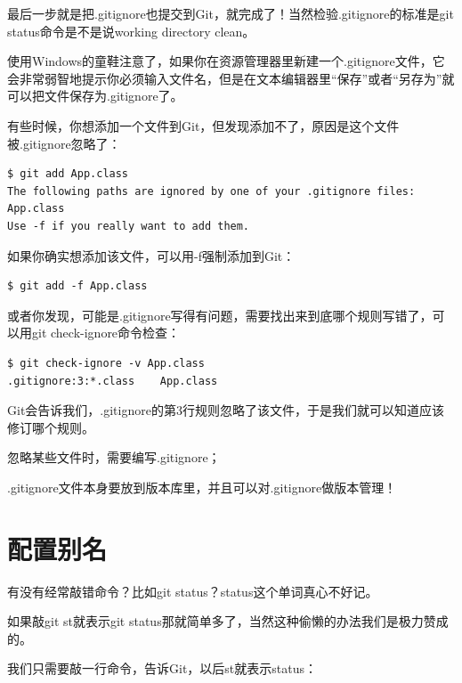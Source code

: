 最后一步就是把.gitignore也提交到Git，就完成了！当然检验.gitignore的标准是git status命令是不是说working directory clean。

使用Windows的童鞋注意了，如果你在资源管理器里新建一个.gitignore文件，它会非常弱智地提示你必须输入文件名，但是在文本编辑器里“保存”或者“另存为”就可以把文件保存为.gitignore了。

有些时候，你想添加一个文件到Git，但发现添加不了，原因是这个文件被.gitignore忽略了：

\begin{verbatim}
$ git add App.class
The following paths are ignored by one of your .gitignore files:
App.class
Use -f if you really want to add them.
\end{verbatim}

如果你确实想添加该文件，可以用-f强制添加到Git：

\begin{verbatim}
$ git add -f App.class
\end{verbatim}

或者你发现，可能是.gitignore写得有问题，需要找出来到底哪个规则写错了，可以用git check-ignore命令检查：

\begin{verbatim}
$ git check-ignore -v App.class
.gitignore:3:*.class	App.class
\end{verbatim}

Git会告诉我们，.gitignore的第3行规则忽略了该文件，于是我们就可以知道应该修订哪个规则。

\begin{tcolorbox}
忽略某些文件时，需要编写.gitignore；

.gitignore文件本身要放到版本库里，并且可以对.gitignore做版本管理！
\end{tcolorbox}

\section{配置别名}
有没有经常敲错命令？比如git status？status这个单词真心不好记。

如果敲git st就表示git status那就简单多了，当然这种偷懒的办法我们是极力赞成的。

我们只需要敲一行命令，告诉Git，以后st就表示status：


